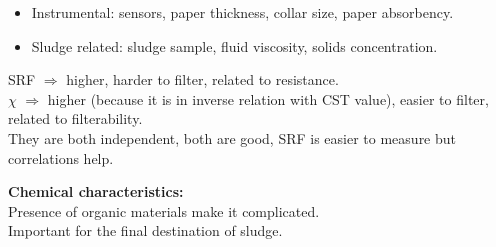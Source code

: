 \documentclass{article}
\numberwithin{equation}{section}
\begin{document}
\begin{enumerate} [start=5]
\begin{enumerate}
\begin{itemize}
        \item Instrumental: sensors, paper thickness, collar size, paper absorbency.
        \item Sludge related: sludge sample, fluid viscosity, solids concentration.
    \end{itemize}
    SRF $\Rightarrow$ higher, harder to filter, related to resistance.\\
    $\chi$ $\Rightarrow$ higher (because it is in inverse relation with CST value), easier to filter, related to filterability.\\
    They are both independent, both are good, SRF is easier to measure but correlations help.
\end{enumerate}
\end{enumerate}
\textbf{Chemical characteristics:}\\
Presence of organic materials make it complicated.\\
Important for the final destination of sludge.
\end{document}
